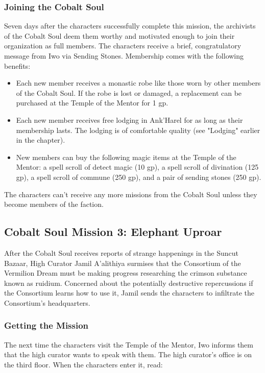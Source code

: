 \documentclass[10pt,a4paper,twoside,twocolumn,openany,nodeprecatedcode]{dndbook}
\begin{document}
\subsubsection{Joining the Cobalt Soul}
Seven days after the characters successfully complete this mission, the archivists of the Cobalt Soul deem them worthy and motivated enough to join their organization as full members. The characters receive a brief, congratulatory message from Iwo via Sending Stones. Membership comes with the following benefits:


\begin{itemize}
\item Each new member receives a monastic robe like those worn by other members of the Cobalt Soul. If the robe is lost or damaged, a replacement can be purchased at the Temple of the Mentor for 1 gp.
\item Each new member receives free lodging in Ank'Harel for as long as their membership lasts. The lodging is of comfortable quality (see "Lodging" earlier in the chapter).
\item New members can buy the following magic items at the Temple of the Mentor: a spell scroll of detect magic (10 gp), a spell scroll of divination (125 gp), a spell scroll of commune (250 gp), and a pair of sending stones (250 gp).
\end{itemize}

The characters can't receive any more missions from the Cobalt Soul unless they become members of the faction.

\subsection{Cobalt Soul Mission 3: Elephant Uproar}
After the Cobalt Soul receives reports of strange happenings in the Suncut Bazaar, High Curator Jamil A'alithiya surmises that the Consortium of the Vermilion Dream must be making progress researching the crimson substance known as ruidium. Concerned about the potentially destructive repercussions if the Consortium learns how to use it, Jamil sends the characters to infiltrate the Consortium's headquarters.

\subsubsection{Getting the Mission}
The next time the characters visit the Temple of the Mentor, Iwo informs them that the high curator wants to speak with them. The high curator's office is on the third floor. When the characters enter it, read:
\end{document}
